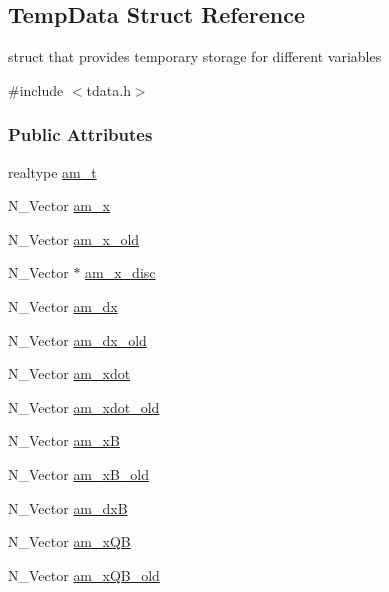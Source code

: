 \hypertarget{struct_temp_data}{}\subsection{Temp\+Data Struct Reference}
\label{struct_temp_data}


struct that provides temporary storage for different variables  




{\ttfamily \#include $<$tdata.\+h$>$}

\subsubsection*{Public Attributes}
\begin{DoxyCompactItemize}
\item 
realtype \hyperlink{struct_temp_data_ae0484650df254ad9cd8883e2ba028892}{am\+\_\+t}
\item 
N\+\_\+\+Vector \hyperlink{struct_temp_data_a4527d9abde45ba3982c35d2c12969d36}{am\+\_\+x}
\item 
N\+\_\+\+Vector \hyperlink{struct_temp_data_ab2b23f4045b47a4a73226543e77f9dcc}{am\+\_\+x\+\_\+old}
\item 
N\+\_\+\+Vector $\ast$ \hyperlink{struct_temp_data_aded6511f60d9b0cdfe5f4df047d8a5dd}{am\+\_\+x\+\_\+disc}
\item 
N\+\_\+\+Vector \hyperlink{struct_temp_data_ac10ec733609d33c557d48c1cc4c9f6f1}{am\+\_\+dx}
\item 
N\+\_\+\+Vector \hyperlink{struct_temp_data_aca2465f16eeb5dc94cea61c970f2682a}{am\+\_\+dx\+\_\+old}
\item 
N\+\_\+\+Vector \hyperlink{struct_temp_data_abad4a9e3cc9cd42b3fe4e2fe28a915c1}{am\+\_\+xdot}
\item 
N\+\_\+\+Vector \hyperlink{struct_temp_data_a6a8af565a7f6ec58c4fbcd044c049d80}{am\+\_\+xdot\+\_\+old}
\item 
N\+\_\+\+Vector \hyperlink{struct_temp_data_a318f0b9b1f4b33326184a350912c6fb1}{am\+\_\+x\+B}
\item 
N\+\_\+\+Vector \hyperlink{struct_temp_data_a33e09af3351a4d4889e62d0d0d964ce5}{am\+\_\+x\+B\+\_\+old}
\item 
N\+\_\+\+Vector \hyperlink{struct_temp_data_a6dc87d123304fe3c6a20899fca777501}{am\+\_\+dx\+B}
\item 
N\+\_\+\+Vector \hyperlink{struct_temp_data_ac4099b4f6bf1f15d7d07b88993515da7}{am\+\_\+x\+Q\+B}
\item 
N\+\_\+\+Vector \hyperlink{struct_temp_data_a132a821ce32c806eb4691a94da216e29}{am\+\_\+x\+Q\+B\+\_\+old}

\end{DoxyCompactItemize}
